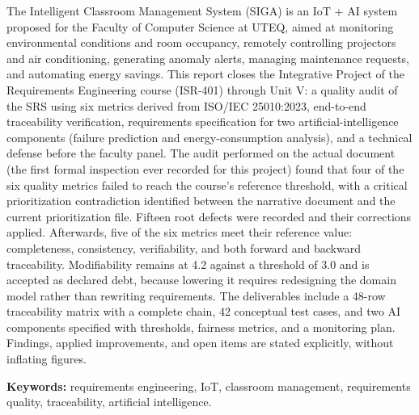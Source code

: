 The Intelligent Classroom Management System (SIGA) is an IoT + AI system proposed for the Faculty of Computer Science at UTEQ, aimed at monitoring environmental conditions and room occupancy, remotely controlling projectors and air conditioning, generating anomaly alerts, managing maintenance requests, and automating energy savings. This report closes the Integrative Project of the Requirements Engineering course (ISR-401) through Unit V: a quality audit of the SRS using six metrics derived from ISO/IEC 25010:2023, end-to-end traceability verification, requirements specification for two artificial-intelligence components (failure prediction and energy-consumption analysis), and a technical defense before the faculty panel. The audit performed on the actual document (the first formal inspection ever recorded for this project) found that four of the six quality metrics failed to reach the course's reference threshold, with a critical prioritization contradiction identified between the narrative document and the current prioritization file. Fifteen root defects were recorded and their corrections applied. Afterwards, five of the six metrics meet their reference value: completeness, consistency, verifiability, and both forward and backward traceability. Modifiability remains at 4.2 against a threshold of 3.0 and is accepted as declared debt, because lowering it requires redesigning the domain model rather than rewriting requirements. The deliverables include a 48-row traceability matrix with a complete chain, 42 conceptual test cases, and two AI components specified with thresholds, fairness metrics, and a monitoring plan. Findings, applied improvements, and open items are stated explicitly, without inflating figures.

\textbf{Keywords:} requirements engineering, IoT, classroom management, requirements quality, traceability, artificial intelligence.
